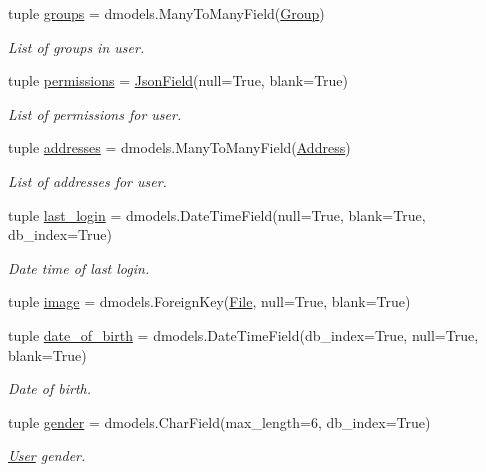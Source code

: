 \begin{DoxyCompactItemize}
tuple \hyperlink{classcore_1_1models_1_1User_a17a29647bdff999f6f8ffc3bf744dd10}{groups} = dmodels.\-Many\-To\-Many\-Field(\hyperlink{classcore_1_1models_1_1Group}{Group})
\begin{DoxyCompactList}\small\item\em List of groups in user. \end{DoxyCompactList}\item 
tuple \hyperlink{classcore_1_1models_1_1User_a784eb0d695f930aeb18eeb4f7f8a166e}{permissions} = \hyperlink{classcore_1_1fields_1_1JsonField}{Json\-Field}(null=True, blank=True)
\begin{DoxyCompactList}\small\item\em List of permissions for user. \end{DoxyCompactList}\item 
tuple \hyperlink{classcore_1_1models_1_1User_ac92e0f9b0871d62b4cb283be3eb44f64}{addresses} = dmodels.\-Many\-To\-Many\-Field(\hyperlink{classcore_1_1models_1_1Address}{Address})
\begin{DoxyCompactList}\small\item\em List of addresses for user. \end{DoxyCompactList}\item 
tuple \hyperlink{classcore_1_1models_1_1User_a95cfe2aedf4dea7b41e0983035663e43}{last\-\_\-login} = dmodels.\-Date\-Time\-Field(null=True, blank=True, db\-\_\-index=True)
\begin{DoxyCompactList}\small\item\em Date time of last login. \end{DoxyCompactList}\item 
tuple \hyperlink{classcore_1_1models_1_1User_ad67e2fdbefe9f02c44070d697cf9faa1}{image} = dmodels.\-Foreign\-Key(\hyperlink{classcore_1_1models_1_1File}{File}, null=True, blank=True)
\item 
tuple \hyperlink{classcore_1_1models_1_1User_a230fb79dd5dd210ea52c4c35cbe122e2}{date\-\_\-of\-\_\-birth} = dmodels.\-Date\-Time\-Field(db\-\_\-index=True, null=True, blank=True)
\begin{DoxyCompactList}\small\item\em Date of birth. \end{DoxyCompactList}\item 
tuple \hyperlink{classcore_1_1models_1_1User_a7dc05b5317795603bcd3ca4dbb5cca8f}{gender} = dmodels.\-Char\-Field(max\-\_\-length=6, db\-\_\-index=True)
\begin{DoxyCompactList}\small\item\em \hyperlink{classcore_1_1models_1_1User}{User} gender. \end{DoxyCompactList}\end{DoxyCompactItemize}


